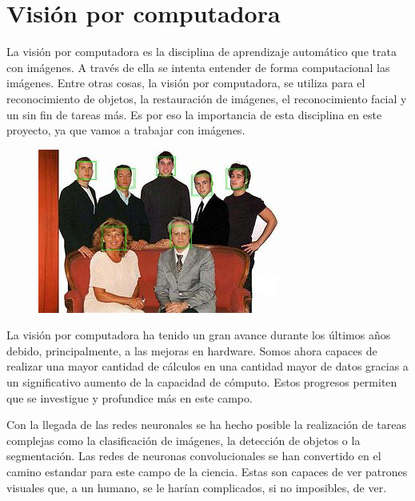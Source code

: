 \documentclass[12pt]{report} %
\begin{document}
	\section{Visión por computadora}
	La visión por computadora es la disciplina de aprendizaje automático que trata con imágenes. A través de ella se intenta entender de forma computacional
	las imágenes. Entre otras cosas, la visión por computadora, se utiliza para el reconocimiento de objetos, la restauración de imágenes, el reconocimiento facial
	y un sin fin de tareas más. Es por eso la importancia de esta disciplina en este proyecto, ya que vamos a trabajar con imágenes.
	\begin{figure}[H]
		{\includegraphics[scale=1]{cv-ejemplo.jpg}}
	\end{figure}
	La visión por computadora ha tenido un gran avance durante los últimos años debido, principalmente, a las mejoras en hardware. Somos ahora capaces de realizar
	una mayor cantidad de cálculos en una cantidad mayor de datos gracias a un significativo aumento de la capacidad de cómputo. Estos progresos permiten 
	que se investigue y profundice más en este campo.

	Con la llegada de las redes neuronales se ha hecho posible la realización de tareas complejas como la clasificación de imágenes,
	la detección de objetos o la segmentación. Las redes de neuronas convolucionales se han convertido en el camino estandar para este campo
	de la ciencia. Estas son capaces de ver patrones visuales que, a un humano, se le harían complicados, si no imposibles, de ver.




\nocite{*} %

\clearpage
{}
\printbibliography




\end{document}
